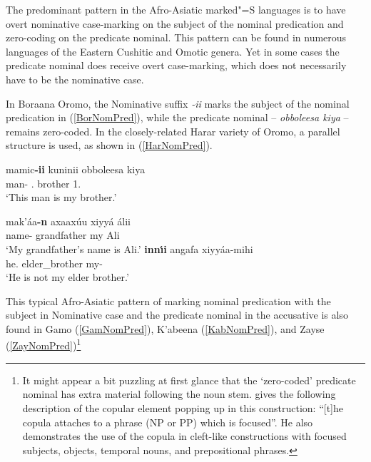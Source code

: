 The predominant pattern in the Afro-Asiatic marked"=S languages is to have overt nominative case-marking on the subject of the nominal predication and zero-coding on the predicate nominal. 
This pattern can be found in numerous languages of the Eastern Cushitic and Omotic genera.
Yet in some cases the predicate nominal does receive overt case-marking, which does not necessarily have to be the nominative case. 

In Boraana Oromo, the Nominative suffix \emph{-ii} marks the subject of the nominal predication in (\ref{BorNomPred}), while the predicate nominal -- \emph{obboleesa kiya} -- remains zero-coded. 
In the closely-related Harar variety of Oromo, a parallel structure is used, as
shown in (\ref{HarNomPred}). 


\begin{exe}\ex\label{BorNomPred}
\gll mamic\textbf{-ii} kuninii obboleesa kiya\\
man-\nom{} \dem{}.\nom{} brother 1\sg{}.\poss{}\\
\glt `This man is my brother.' \end{exe}

\begin{exe}\ex\label{HarNomPred}
\begin{xlist}\ex\gll mak'\'aa\textbf{-n} axaax\'uu xiyy\'a \'alii\\
name-\nom{} grandfather my Ali\\
\glt `My grandfather's name is Ali.'
\ex \gll \textbf{inn\'\i i} angafa xiyy\'aa-mihi\\
he.\nom{} {elder\_brother} my-\Neg{}\\
\glt `He is not my elder brother.'
\end{xlist}
\end{exe}

This typical Afro-Asiatic pattern of marking nominal predication with the subject in Nominative case  and the predicate nominal in the accusative is also found in Gamo (\ref{GamNomPred}), K'abeena (\ref{KabNomPred}), and Zayse (\ref{ZayNomPred})\footnote{It might appear a bit puzzling at first glance that the `zero-coded' predicate nominal has extra material following the noun stem. 
\citet[280--281]{Hayward:1990} gives the following description of the copular element popping up in this construction: ``[t]he copula attaches to a phrase (NP or PP) which is focused''. 
He also demonstrates the use of the copula in cleft-like constructions with focused subjects, objects, temporal nouns, and prepositional phrases.}

